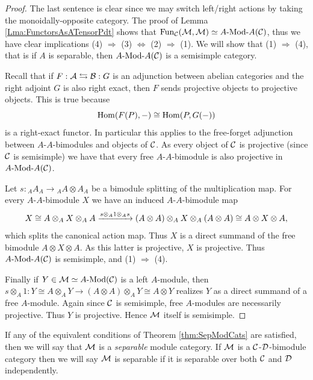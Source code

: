 \documentclass{amsart}
\begin{document}
\begin{proof}
	The last sentence is clear since we may switch left/right actions by taking the monoidally-opposite category.
	The proof of Lemma \ref{Lma:FunctorsAsATensorPdt} shows that $\Fun_\cC(\cM, \cM) \simeq \Mod{A}{A}(\cC)$, thus we have clear implications (4) $\Rightarrow$ (3) $\Leftrightarrow$ (2) $\Rightarrow$ (1). We will show that (1) $\Rightarrow$ (4), that is if $A$ is separable, then $\Mod{A}{A}(\cC)$ is a semisimple category. 
	
	Recall that if $F: \mathcal A \leftrightarrows \mathcal B: G$ is an adjunction between abelian categories and the right adjoint $G$ is also right exact, then $F$ sends projective objects to projective objects. This is true because
	\begin{equation*}
		\operatorname{Hom}(F(P), -) \cong \operatorname{Hom}(P, G(-))
	\end{equation*}
	is a right-exact functor. In particular this applies to the free-forget adjunction between $A$-$A$-bimodules and objects of $\mathcal C$. As every object of $\mathcal C$ is projective (since $\mathcal C$ is semisimple) we have that every free $A$-$A$-bimodule is also projective in $\Mod{A}{A}(\cC)$. 
	
Let $s: {}_AA_A \to {}_AA \otimes A_A$ be a bimodule splitting of the multiplication map. For every $A$-$A$-bimodule $X$ we have an induced $A$-$A$-bimodule map
\begin{equation*}
	X \cong A \otimes_A X \otimes_A A 
	\xrightarrow{s \otimes_A 1 \otimes_A s} (A \otimes A) \otimes_A X \otimes_A (A \otimes A) \cong A \otimes X \otimes A,
\end{equation*}  	
which splits the canonical action map. Thus $X$ is a direct summand of the free bimodule $A \otimes X \otimes A$. As this latter is projective, $X$ is projective. Thus $\Mod{A}{A}(\cC)$ is semisimple, and (1) $\Rightarrow$ (4). 
	
Finally if $Y \in \cM \simeq \Mod{A}{}(\cC)$ is a left $A$-module, then $s \otimes_A 1: Y \cong A \otimes_A Y \to (A \otimes A) \otimes_A Y \cong A \otimes Y$ realizes $Y$ as a direct summand of a free $A$-module. Again since $\mathcal C$ is semisimple, free $A$-modules are necessarily projective. Thus $Y$ is projective. Hence $\mathcal M$ itself is semisimple.  	
\end{proof}

\begin{definition}
	If any of the equivalent conditions of Theorem \ref{thm:SepModCats} are satisfied, then we will say that $\mathcal M$ is a {\em separable} module category. If $\mathcal M$ is a $\mathcal C$-$\mathcal D$-bimodule category then we will say $\mathcal M$ is separable if it is separable over both $\mathcal C$ and $\mathcal D$ independently. 
\end{definition}
\end{document}
